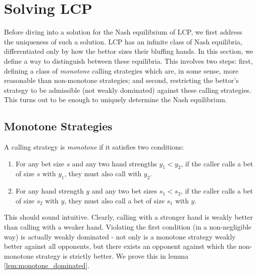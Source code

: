 \documentclass[../../main/main.tex]{subfiles}
\begin{document}
\section{Solving LCP}

Before diving into a solution for the Nash equilibrium of LCP, we first address the uniqueness of such a solution. LCP has an infinite class of Nash equilibria, differentiated only by how the bettor sizes their bluffing hands. In this section, we define a way to distinguish between these equilibria. This involves two steps: first, defining a class of \textit{monotone} calling strategies which are, in some sense, more reasonable than non-monotone strategies; and second, restricting the bettor's strategy to be admissible (not weakly dominated) against these calling strategies. This turns out to be enough to uniquely determine the Nash equilibrium.

\subsection{Monotone Strategies}

\begin{definition}
    A calling strategy is \textit{monotone} if it satisfies two conditions:
    \begin{enumerate}
        \item For any bet size $s$ and any two hand strengths $y_1 < y_2$, if the caller calls a bet of size $s$ with $y_1$, they must also call with $y_2$.
        \item For any hand strength $y$ and any two bet sizes $s_1 < s_2$, if the caller calls a bet of size $s_2$ with $y$, they must also call a bet of size $s_1$ with $y$.
    \end{enumerate}
\end{definition}

This should sound intuitive. Clearly, calling with a stronger hand is weakly better than calling with a weaker hand. Violating the first condition (in a non-negligible way) is actually weakly dominated - not only is a monotone strategy weakly better against all opponents, but there exists an opponent against which the non-monotone strategy is strictly better. We prove this in lemma \ref{lem:monotone_dominated}.
\end{document}
